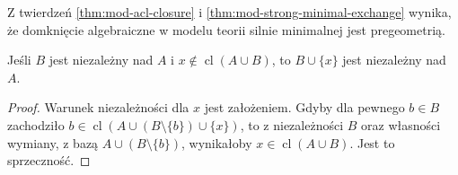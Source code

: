 Z twierdzeń \ref{thm:mod-acl-closure}
i \ref{thm:mod-strong-minimal-exchange}
wynika, że domknięcie algebraiczne w modelu
teorii silnie minimalnej jest pregeometrią.

\begin{lemat}
\label{lem:mod-pregeometry-add}
Jeśli $B$ jest niezależny nad $A$ i
$x\notin\operatorname{cl}(A\cup B)$,
to $B\cup\{x\}$ jest niezależny nad $A$.
\end{lemat}
\begin{proof}
Warunek niezależności dla $x$ jest założeniem.
Gdyby dla pewnego $b\in B$ zachodziło
$b\in\operatorname{cl}(A\cup(B\setminus\{b\})\cup\{x\})$,
to z niezależności $B$ oraz własności wymiany,
z bazą $A\cup(B\setminus\{b\})$, wynikałoby
$x\in\operatorname{cl}(A\cup B)$.
Jest to sprzeczność.
\end{proof}

